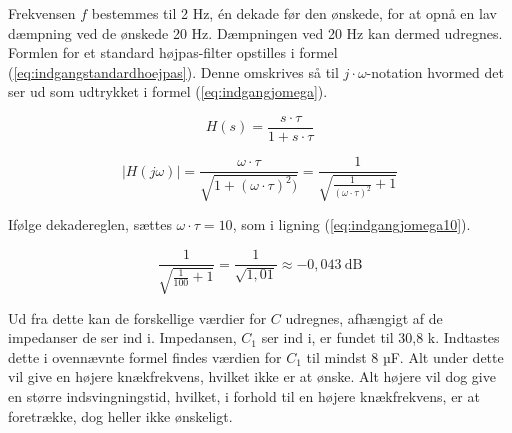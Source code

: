 Frekvensen $f$ bestemmes til 2 Hz, én dekade før den ønskede, for at opnå en lav dæmpning ved de ønskede 20 Hz. Dæmpningen ved 20 Hz kan dermed udregnes. Formlen for et standard højpas-filter opstilles i formel (\ref{eq:indgangstandardhoejpas}). Denne omskrives så til $j\cdot\omega$-notation hvormed det ser ud som udtrykket i formel (\ref{eq:indgangjomega}).

\begin{equation}
\label{eq:indgangstandardhoejpas}
H(s)=\frac{s\cdot\tau}{1+s\cdot\tau}
\end{equation}

\begin{equation}
\label{eq:indgangjomega}
\left| H(j\omega) \right| = \frac{\omega\cdot\tau}{\sqrt{1+(\omega\cdot\tau)^2)}}=\frac{1}{\sqrt{\frac{1}{(\omega\cdot\tau)^2}+1}}
\end{equation}

Ifølge dekadereglen, sættes $\omega\cdot\tau = 10$, som i ligning (\ref{eq:indgangjomega10}).

\begin{equation}
\label{eq:indgangjomega10}
\frac{1}{\sqrt{\frac{1}{100}+1}}=\frac{1}{\sqrt{1,01}}\approx -0,043~\mathrm{dB}
\end{equation}

Ud fra dette kan de forskellige værdier for $C$ udregnes, afhængigt af de impedanser de ser ind i.
Impedansen, $C_1$ ser ind i, er fundet til 30,8 k\ohm . Indtastes dette i ovennævnte formel findes værdien for $C_1$ til mindst 8 µF. Alt under dette vil give en højere knækfrekvens, hvilket ikke er at ønske. Alt højere vil dog give en større indsvingningstid, hvilket, i forhold til en højere knækfrekvens, er at foretrække, dog heller ikke ønskeligt.


